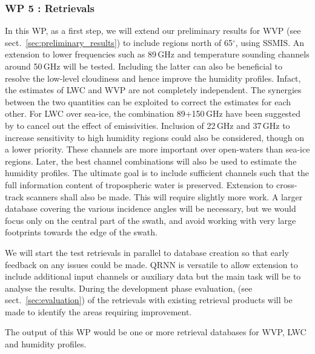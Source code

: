 \documentclass[12pt,oneside,a4paper]{article}
\begin{document}
\subsubsection*{WP 5 : Retrievals}
%
\label{sec:retrievals}
%
In this WP, as a first step, we will extend our preliminary results for WVP (see sect.~\ref{sec:preliminary_results}) to include regions north of 65$^\circ$, using SSMIS.  An extension to lower frequencies such as  89\,GHz and temperature sounding channels around 50\,GHz will be tested. Including the latter can also be beneficial to resolve the low-level cloudiness and hence improve the humidity profiles. Infact, the estimates of LWC and WVP are not completely independent. The synergies between the two quantities can be exploited to correct the estimates for each other. For LWC over sea-ice, the combination 89+150\,GHz have been suggested by \citet{laue:2007:poten} to cancel out the effect of emissivities. Inclusion of 22\,GHz and 37\,GHz to increase sensitivity to high humidity regions could also be considered, though on a lower priority. These channels are more important over open-waters than sea-ice regions. Later, the best channel combinations will also be used to estimate the humidity profiles. The ultimate goal is to include sufficient channels such that the full information content of tropospheric water is preserved. Extension to cross-track scanners shall also be made. This will require slightly more work. A larger database covering the various incidence angles will be necessary, but we would focus only on the central part of the swath, and avoid working with very large footprints towards the edge of the swath. 

We will start the test retrievals in parallel to database creation so that early feedback on any issues could be made. QRNN is versatile to allow extension to include additional input channels or auxiliary data but the main task will be to analyse the results. During the development phase evaluation, (see sect.~\ref{sec:evaluation}) of the retrievals with existing retrieval products will be made to identify the areas requiring improvement.

The output of this WP would be one or more retrieval databases for WVP, LWC and humidity profiles.
\end{document}
